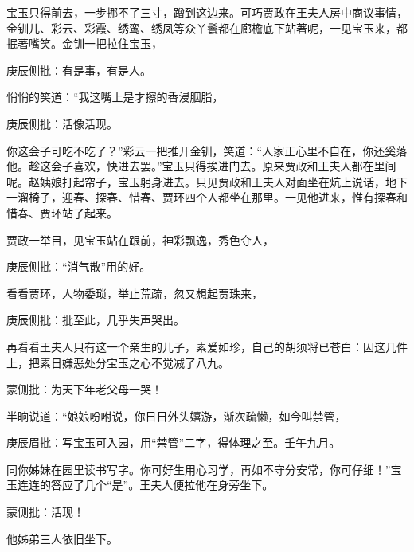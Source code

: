 \begin{parag}
    宝玉只得前去，一步挪不了三寸，蹭到这边来。可巧贾政在王夫人房中商议事情，金钏儿、彩云、彩霞、绣鸾、绣凤等众丫鬟都在廊檐底下站著呢，一见宝玉来，都抿著嘴笑。金钏一把拉住宝玉，\begin{note}庚辰侧批：有是事，有是人。\end{note}悄悄的笑道：“我这嘴上是才擦的香浸胭脂，\begin{note}庚辰侧批：活像活现。\end{note}你这会子可吃不吃了？”彩云一把推开金钏，笑道：“人家正心里不自在，你还奚落他。趁这会子喜欢，快进去罢。”宝玉只得挨进门去。原来贾政和王夫人都在里间呢。赵姨娘打起帘子，宝玉躬身进去。只见贾政和王夫人对面坐在炕上说话，地下一溜椅子，迎春、探春、惜春、贾环四个人都坐在那里。一见他进来，惟有探春和惜春、贾环站了起来。
\end{parag}


\begin{parag}
    贾政一举目，见宝玉站在跟前，神彩飘逸，秀色夺人，\begin{note}庚辰侧批：“消气散”用的好。\end{note}看看贾环，人物委琐，举止荒疏，忽又想起贾珠来，\begin{note}庚辰侧批：批至此，几乎失声哭出。\end{note}再看看王夫人只有这一个亲生的儿子，素爱如珍，自己的胡须将已苍白：因这几件上，把素日嫌恶处分宝玉之心不觉减了八九。\begin{note}蒙侧批：为天下年老父母一哭！\end{note}半晌说道：“娘娘吩咐说，你日日外头嬉游，渐次疏懒，如今叫禁管，\begin{note}庚辰眉批：写宝玉可入园，用“禁管”二字，得体理之至。壬午九月。\end{note}同你姊妹在园里读书写字。你可好生用心习学，再如不守分安常，你可仔细！”宝玉连连的答应了几个“是”。王夫人便拉他在身旁坐下。\begin{note}蒙侧批：活现！\end{note}他姊弟三人依旧坐下。
\end{parag}


